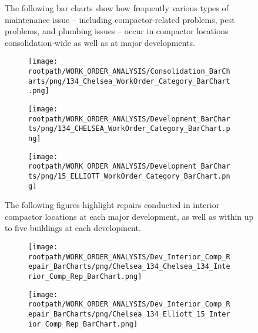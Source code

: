 \begin{figure}[h]
                                \sf
                                The following bar charts show how frequently various types of maintenance issue -- including compactor-related problems, pest problems, and plumbing issues -- occur in compactor locations consolidation-wide as well as at major developments.
                                \raggedright
                                \begin{subfigure}{\textwidth}
                                \texttt{[image: \\rootpath/WORK\_ORDER\_ANALYSIS/Consolidation\_BarCharts/png/134\_Chelsea\_WorkOrder\_Category\_BarChart.png]}
                                \end{subfigure}
                                \begin{subfigure}{0.45\textwidth}
                                        \texttt{[image: \\rootpath/WORK\_ORDER\_ANALYSIS/Development\_BarCharts/png/134\_CHELSEA\_WorkOrder\_Category\_BarChart.png]}
                                        \end{subfigure}
                                        \begin{subfigure}{0.45\textwidth}
                                        \texttt{[image: \\rootpath/WORK\_ORDER\_ANALYSIS/Development\_BarCharts/png/15\_ELLIOTT\_WorkOrder\_Category\_BarChart.png]}
                                        \end{subfigure}
                                        \end{figure}
\begin{figure}[h]
                                \raggedright
                                \sf
                                The following figures highlight repairs conducted in interior compactor locations at each major development, as well as within up to five buildings at each development.\\
                                \begin{subfigure}{0.45\textwidth}
                                        \texttt{[image: \\rootpath/WORK\_ORDER\_ANALYSIS/Dev\_Interior\_Comp\_Repair\_BarCharts/png/Chelsea\_134\_Chelsea\_134\_Interior\_Comp\_Rep\_BarChart.png]}
                                        \end{subfigure}
                                        \begin{subfigure}{0.45\textwidth}
                                        \texttt{[image: \\rootpath/WORK\_ORDER\_ANALYSIS/Dev\_Interior\_Comp\_Repair\_BarCharts/png/Chelsea\_134\_Elliott\_15\_Interior\_Comp\_Rep\_BarChart.png]}
                                        \end{subfigure}
                                        
\end{figure}
